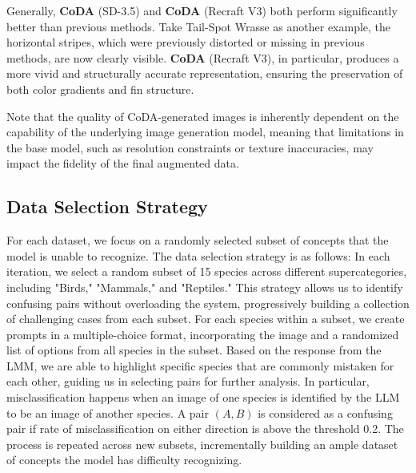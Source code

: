 Generally, \textbf{CoDA} (SD-3.5) and \textbf{CoDA} (Recraft V3) both perform significantly better than previous methods. Take Tail-Spot Wrasse as another example, the horizontal stripes, which were previously distorted or missing in previous methods, are now clearly visible. \textbf{CoDA} (Recraft V3), in particular, produces a more vivid and structurally accurate representation, ensuring the preservation of both color gradients and fin structure.

Note that the quality of CoDA-generated images is inherently dependent on the capability of the underlying image generation model, meaning that limitations in the base model, such as resolution constraints or texture inaccuracies, may impact the fidelity of the final augmented data.


\subsection{Data Selection Strategy}
\label{subsec:data_selection_strategy}
For each dataset, we focus on a randomly selected subset of concepts that the model is unable to recognize. The data selection strategy is as follows: In each iteration, we select a random subset of 15 species across different supercategories, including "Birds," "Mammals," and "Reptiles." This strategy allows us to identify confusing pairs without overloading the system, progressively building a collection of challenging cases from each subset. For each species within a subset, we create prompts in a multiple-choice format, incorporating the image and a randomized list of options from all species in the subset. Based on the response from the LMM, we are able to highlight specific species that are commonly mistaken for each other, guiding us in selecting pairs for further analysis. In particular, misclassification happens when an image of one species is identified by the LLM to be an image of another species. A pair \((A, B)\) is considered as a confusing pair if rate of misclassification on either direction is above the threshold 0.2. The process is repeated across new subsets, incrementally building an ample dataset of concepts the model has difficulty recognizing.



